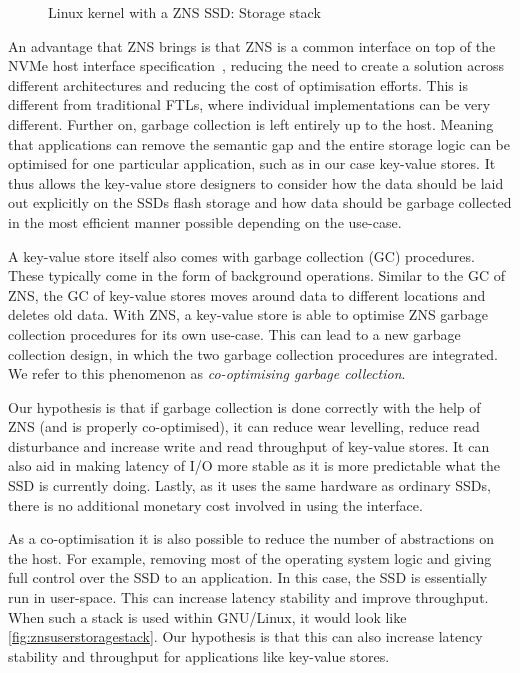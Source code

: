 \begin{figure}[t!]
\centering
\begin{minipage}{0.45\textwidth}
  \centering
  
\end{minipage}%
\caption{Linux kernel with a ZNS SSD: Storage stack}
\label{fig:znsstoragestack}
\end{figure}

An advantage that ZNS brings is that ZNS is a common interface on top of the NVMe host interface specification~\cite{NVMeSpec}, reducing the need to create a solution across different architectures and reducing the cost of optimisation efforts. This is different from traditional FTLs, where individual implementations can be very different. Further on, garbage collection is left entirely up to the host. Meaning that applications can remove the semantic gap and the entire storage logic can be optimised for one particular application, such as in our case key-value stores. It thus allows the key-value store designers to consider how the data should be laid out explicitly on the SSDs flash storage and how data should be garbage collected in the most efficient manner possible depending on the use-case. 

A key-value store itself also comes with garbage collection (GC) procedures. These typically come in the form of background operations. Similar to the GC of ZNS, the GC of key-value stores moves around data to different locations and deletes old data. With ZNS, a key-value store is able to optimise ZNS garbage collection procedures for its own use-case. This can lead to a new garbage collection design, in which the two garbage collection procedures are integrated. We refer to this phenomenon as \textit{co-optimising garbage collection}.

Our hypothesis is that if garbage collection is done correctly with the help of ZNS (and is properly co-optimised), it can reduce wear levelling, reduce read disturbance and increase write and read throughput of key-value stores. It can also aid in making latency of I/O more stable as it is more predictable what the SSD is currently doing. Lastly, as it uses the same hardware as ordinary SSDs, there is no additional monetary cost involved in using the interface.

As a co-optimisation it is also possible to reduce the number of abstractions on the host. For example, removing most of the operating system logic and giving full control over the SSD to an application. In this case, the SSD is essentially run in user-space. This can increase latency stability and improve throughput. When such a stack is used within GNU/Linux, it would look like \autoref{fig:znsuserstoragestack}.
Our hypothesis is that this can also increase latency stability and throughput for applications like key-value stores.


